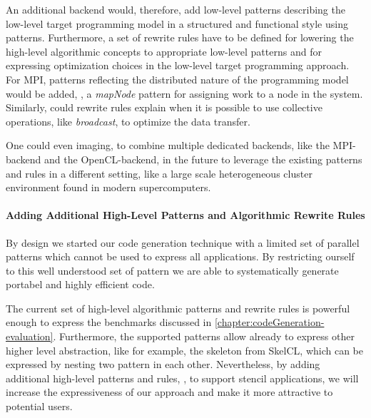 An additional backend would, therefore, add low-level patterns describing the low-level target programming model in a structured and functional style using patterns.
Furthermore, a set of rewrite rules have to be defined for lowering the high-level algorithmic concepts to appropriate low-level patterns and for expressing optimization choices in the low-level target programming approach.
For MPI, patterns reflecting the distributed nature of the programming model would be added, \eg, a \emph{mapNode} pattern for assigning work to a node in the system.
Similarly, could rewrite rules explain when it is possible to use collective operations, like \emph{broadcast}, to optimize the data transfer.

One could even imaging, to combine multiple dedicated backends, like the MPI-backend and the OpenCL-backend, in the future to leverage the existing patterns and rules in a different setting, like a large scale heterogeneous cluster environment found in modern supercomputers.

\paragraph{Adding Additional High-Level Patterns and Algorithmic Rewrite Rules}
By design we started our code generation technique with a limited set of parallel patterns which cannot be used to express all applications.
By restricting ourself to this well understood set of pattern we are able to systematically generate portabel and highly efficient code.

The current set of high-level algorithmic patterns and rewrite rules is powerful enough to express the benchmarks discussed in \autoref{chapter:codeGeneration-evaluation}.
Furthermore, the supported patterns allow already to express other higher level abstraction, like for example, the \allpairs skeleton from SkelCL, which can be expressed by nesting two \map pattern in each other.
Nevertheless, by adding additional high-level patterns and rules, \eg, to support stencil applications, we will increase the expressiveness of our approach and make it more attractive to potential users.

